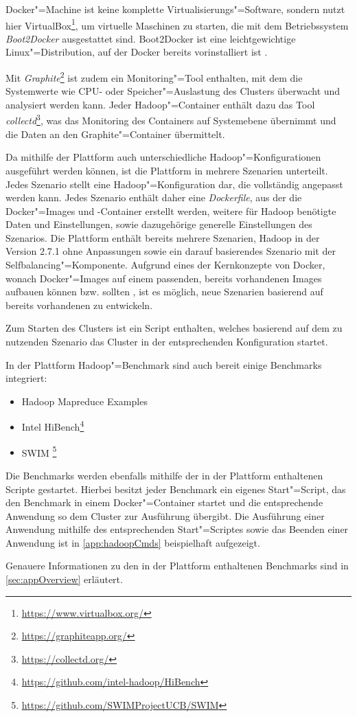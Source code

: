 Docker"=Machine ist keine komplette Virtualisierungs"=Software, sondern nutzt hier VirtualBox\footnote{\url{https://www.virtualbox.org/}}, um virtuelle Maschinen zu starten, die mit dem Betriebssystem \emph{Boot2Docker} ausgestattet sind.
Boot2Docker ist eine leichtgewichtige Linux"=Distribution, auf der Docker bereits vorinstalliert ist \cite{DockerMachineGettingStartedVm}.

Mit \emph{Graphite}\footnote{\url{https://graphiteapp.org/}} ist zudem ein Monitoring"=Tool enthalten, mit dem die Systemwerte wie CPU- oder Speicher"=Auslastung des Clusters überwacht und analysiert werden kann.
Jeder Hadoop"=Container enthält dazu das Tool \emph{collectd}\footnote{\url{https://collectd.org/}}, was das Monitoring des Containers auf Systemebene übernimmt und die Daten an den Graphite"=Container übermittelt.

Da mithilfe der Plattform auch unterschiedliche Hadoop"=Konfigurationen ausgeführt werden können, ist die Plattform in mehrere Szenarien unterteilt.
Jedes Szenario stellt eine Hadoop"=Konfiguration dar, die vollständig angepasst werden kann.
Jedes Szenario enthält daher eine \emph{Dockerfile}, aus der die Docker"=Images und -Container erstellt werden, weitere für Hadoop benötigte Daten und Einstellungen, sowie dazugehörige generelle Einstellungen des Szenarios.
Die Plattform enthält bereits mehrere Szenarien, \uA Hadoop in der Version 2.7.1 ohne Anpassungen sowie ein darauf basierendes Szenario mit der Selfbalancing"=Komponente.
Aufgrund eines der Kernkonzepte von Docker, wonach Docker"=Images auf einem passenden, bereits vorhandenen Images aufbauen können bzw. sollten \cite{DockerdevBestPractice}, ist es möglich, neue Szenarien basierend auf bereits vorhandenen zu entwickeln.

Zum Starten des Clusters ist ein Script enthalten, welches basierend auf dem zu nutzenden Szenario das Cluster in der entsprechenden Konfiguration startet.

In der Plattform Hadoop"=Benchmark sind auch bereit einige Benchmarks integriert:

\begin{itemize}
    \item Hadoop Mapreduce Examples
    \item Intel HiBench\footnote{\url{https://github.com/intel-hadoop/HiBench}}
    \item \gls{SWIM} \footnote{\url{https://github.com/SWIMProjectUCB/SWIM}}
\end{itemize}

Die Benchmarks werden ebenfalls mithilfe der in der Plattform enthaltenen Scripte gestartet.
Hierbei besitzt jeder Benchmark ein eigenes Start"=Script, das den Benchmark in einem Docker"=Container startet und die entsprechende \gls{Anwendung} so dem Cluster zur Ausführung übergibt.
Die Ausführung einer \gls{Anwendung} mithilfe des entsprechenden Start"=Scriptes sowie das Beenden einer \gls{Anwendung} ist in \cref{app:hadoopCmds} beispielhaft aufgezeigt.

Genauere Informationen zu den in der Plattform enthaltenen Benchmarks sind in \cref{sec:appOverview} erläutert.
